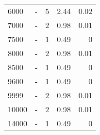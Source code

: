 \begin{longtable}{lXrrr}
        6000 & \multicolumn{1}{X}{-} & %
          \num{5} &
          \num[round-mode=places,round-precision=2]{2.44} &
          \num[round-mode=places,round-precision=2]{0.02} \\

        7000 & \multicolumn{1}{X}{-} & %
          \num{2} &
          \num[round-mode=places,round-precision=2]{0.98} &
          \num[round-mode=places,round-precision=2]{0.01} \\

        7500 & \multicolumn{1}{X}{-} & %
          \num{1} &
          \num[round-mode=places,round-precision=2]{0.49} &
          \num[round-mode=places,round-precision=2]{0} \\

        8000 & \multicolumn{1}{X}{-} & %
          \num{2} &
          \num[round-mode=places,round-precision=2]{0.98} &
          \num[round-mode=places,round-precision=2]{0.01} \\

        8500 & \multicolumn{1}{X}{-} & %
          \num{1} &
          \num[round-mode=places,round-precision=2]{0.49} &
          \num[round-mode=places,round-precision=2]{0} \\

        9600 & \multicolumn{1}{X}{-} & %
          \num{1} &
          \num[round-mode=places,round-precision=2]{0.49} &
          \num[round-mode=places,round-precision=2]{0} \\

        9999 & \multicolumn{1}{X}{-} & %
          \num{2} &
          \num[round-mode=places,round-precision=2]{0.98} &
          \num[round-mode=places,round-precision=2]{0.01} \\

        10000 & \multicolumn{1}{X}{-} & %
          \num{2} &
          \num[round-mode=places,round-precision=2]{0.98} &
          \num[round-mode=places,round-precision=2]{0.01} \\

        14000 & \multicolumn{1}{X}{-} & %
          \num{1} &
          \num[round-mode=places,round-precision=2]{0.49} &
          \num[round-mode=places,round-precision=2]{0} \\


\end{longtable}
